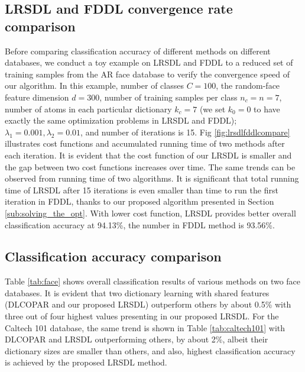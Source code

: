 \documentclass[letterpaper]{article}
\begin{document}
\subsection{LRSDL and FDDL convergence rate comparison} %
\vspace{-0.1in}
\label{sub:compare_fddl_and_lrsdl_runnng}
Before comparing classification accuracy of different methods on different databases, we conduct a toy example on LRSDL and FDDL to a reduced set of training samples from the AR face database to verify the convergence speed of our algorithm. In this example, number of classes $C = 100$, the random-face feature dimension $d = 300$, number of training samples per class $n_c = n = 7$, number of atoms in each particular dictionary $k_c = 7$ (we set $k_0 = 0$ to have exactly the same optimization problems in LRSDL and FDDL); $\lambda_1 = 0.001, \lambda_2 = 0.01$, and number of iterations is 15. Fig \ref{fig:lrsdlfddlcompare} illustrates cost functions and accumulated running time of two methods after each iteration. It is evident that the cost function of our LRSDL is smaller and the gap between two cost functions increases over time. The same trends can be observed from running time of two algorithms. It is significant that total running time of LRSDL after 15 iterations is even smaller than time to run the first iteration in FDDL, thanks to our proposed algorithm presented in Section \ref{sub:solving_the_opt}. With lower cost function, LRSDL provides better overall classification accuracy at 94.13\%, the number in FDDL method is 93.56\%.




\vspace{-0.15in}
\subsection{Classification accuracy comparison} %
\label{sub:exp}
Table \ref{tab:face} shows overall classification results of various methods on two face databases. It is evident that two dictionary learning with shared features (DLCOPAR\cite{kong2012dictionary} and our proposed LRSDL) outperform others by about 0.5\% with three out of four highest values presenting in our proposed LRSDL. For the Caltech 101 database, the same trend is shown in Table \ref{tab:caltech101} with DLCOPAR\cite{kong2012dictionary} and LRSDL outperforming others, by about 2\%, albeit their dictionary sizes are smaller than others, and also, highest classification accuracy is achieved by the proposed LRSDL method.







\newpage
\pagebreak

{\small }
\end{document}
